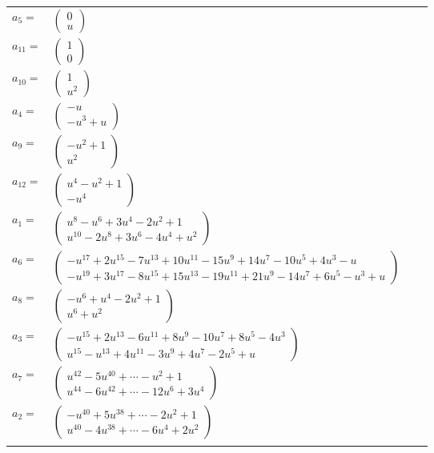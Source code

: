 \documentclass[1p]{elsarticle_modified}
\theoremstyle{definition}
\begin{document}
\begin{tabular}{m{7pt} m{180pt} m{7pt} m{180pt} }
\flushright $a_{5}=$&$\begin{pmatrix}0\\u\end{pmatrix}$ \\
\flushright $a_{11}=$&$\begin{pmatrix}1\\0\end{pmatrix}$ \\
\flushright $a_{10}=$&$\begin{pmatrix}1\\u^2\end{pmatrix}$ \\
\flushright $a_{4}=$&$\begin{pmatrix}- u\\- u^3+u\end{pmatrix}$ \\
\flushright $a_{9}=$&$\begin{pmatrix}- u^2+1\\u^2\end{pmatrix}$ \\
\flushright $a_{12}=$&$\begin{pmatrix}u^4- u^2+1\\- u^4\end{pmatrix}$ \\
\flushright $a_{1}=$&$\begin{pmatrix}u^8- u^6+3 u^4-2 u^2+1\\u^{10}-2 u^8+3 u^6-4 u^4+u^2\end{pmatrix}$ \\
\flushright $a_{6}=$&$\begin{pmatrix}- u^{17}+2 u^{15}-7 u^{13}+10 u^{11}-15 u^9+14 u^7-10 u^5+4 u^3- u\\- u^{19}+3 u^{17}-8 u^{15}+15 u^{13}-19 u^{11}+21 u^9-14 u^7+6 u^5- u^3+u\end{pmatrix}$ \\
\flushright $a_{8}=$&$\begin{pmatrix}- u^6+u^4-2 u^2+1\\u^6+u^2\end{pmatrix}$ \\
\flushright $a_{3}=$&$\begin{pmatrix}- u^{15}+2 u^{13}-6 u^{11}+8 u^9-10 u^7+8 u^5-4 u^3\\u^{15}- u^{13}+4 u^{11}-3 u^9+4 u^7-2 u^5+u\end{pmatrix}$ \\
\flushright $a_{7}=$&$\begin{pmatrix}u^{42}-5 u^{40}+\cdots- u^2+1\\u^{44}-6 u^{42}+\cdots-12 u^6+3 u^4\end{pmatrix}$ \\
\flushright $a_{2}=$&$\begin{pmatrix}- u^{40}+5 u^{38}+\cdots-2 u^2+1\\u^{40}-4 u^{38}+\cdots-6 u^4+2 u^2\end{pmatrix}$\\&\end{tabular}
\end{document}

